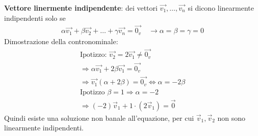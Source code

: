 \documentclass[10pt]{extarticle}
\begin{document}
\noindent\vspace{5px} 
\textbf{Vettore linermente indipendente}: dei vettori $\vec{v_1},\dots,\vec{v_n}$ si dicono linearmente indipendenti solo se 
\begin{align*}
    \alpha\vec{v_1}+\beta\vec{v_2}+\dots+\gamma\vec{v_n}=\vec{0_v} \quad \to \alpha=\beta=\gamma=0
\end{align*}
Dimostrazione della contronominale: 
\begin{align*}
    \text{Ipotizzo: } \vec{v_2}=2\vec{v_1} \neq \vec{0_v}\\
    \Rightarrow \alpha\vec{v_1}+2\beta\vec{v_1}=\vec{0_v} \\
    \Rightarrow \vec{v_1}(\alpha+2\beta)=\vec{0_v} \iff \alpha=-2\beta\\
   \text{Ipotizzo } \beta = 1 \Rightarrow \alpha = -2 \\
    \Rightarrow (-2) \vec{v}_1 + 1 \cdot (2 \vec{v}_1) = \vec{0}
\end{align*}
Quindi esiste una soluzione non banale all’equazione, per cui \(\vec{v}_1, \vec{v}_2\) non sono linearmente indipendenti. 
\end{document}
